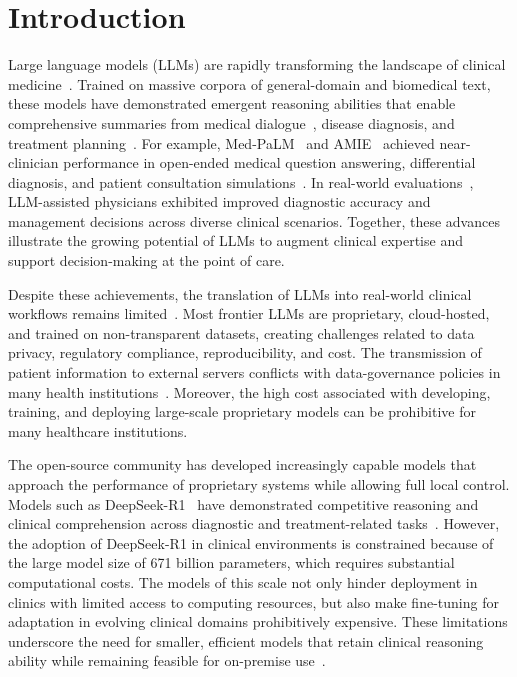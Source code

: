\documentclass[10pt,journal,compsoc, onecolumn]{IEEEtran}
\begin{document}
\section*{Introduction}
Large language models (LLMs) are rapidly transforming the landscape of clinical medicine~\cite{thirunavukarasu2023llmedicine, omiye2024pitfalls}. Trained on massive corpora of general-domain and biomedical text, these models have demonstrated emergent reasoning abilities that enable comprehensive summaries from medical dialogue~\cite{NMed-LLMSummary}, disease diagnosis, and treatment planning~\cite{MedFound}. For example, Med-PaLM~\cite{MedPALM1,MedPALM2} and AMIE~\cite{AMIE-diagnosis,AMIE-conversation} achieved near-clinician performance in open-ended medical question answering, differential diagnosis, and patient consultation simulations~\cite{qiu2025medrench}. In real-world evaluations~\cite{openai-AIConsult, goh2025gpt4rct}, LLM-assisted physicians exhibited improved diagnostic accuracy and management decisions across diverse clinical scenarios. Together, these advances illustrate the growing potential of LLMs to augment clinical expertise and support decision-making at the point of care.

Despite these achievements, the translation of LLMs into real-world clinical workflows remains limited~\cite{hager2024limitations}. Most frontier LLMs are proprietary, cloud-hosted, and trained on non-transparent datasets, creating challenges related to data privacy, regulatory compliance, reproducibility, and cost. The transmission of patient information to external servers conflicts with data-governance policies in many health institutions~\cite{kim2025privacy, clusmann2025implementing}. Moreover, the high cost associated with developing, training, and deploying large-scale proprietary models can be prohibitive for many healthcare institutions. 

The open-source community has developed increasingly capable models that approach the performance of proprietary systems while allowing full local control. Models such as DeepSeek-R1~\cite{DeepSeek-R1} have demonstrated competitive reasoning and clinical comprehension across diagnostic and treatment-related tasks~\cite{eval-deepseek,eval-deepseek125Patients, wang2025jarvis, moell2025deepseek, deepseek2025cme}. 
However, the adoption of DeepSeek-R1 in clinical environments is constrained because of the large model size of 671 billion parameters, which requires substantial computational costs. The models of this scale not only hinder deployment in clinics with limited access to computing resources, but also make fine-tuning for adaptation in evolving clinical domains prohibitively expensive. 
These limitations underscore the need for smaller, efficient models that retain clinical reasoning ability while remaining feasible for on-premise use~\cite{garg2025rise, builtjes2025leveraging}.
\end{document}
